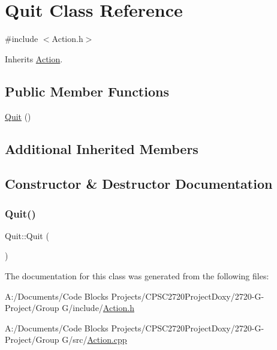 \hypertarget{class_quit}{}\section{Quit Class Reference}
\label{class_quit}


{\ttfamily \#include $<$Action.\+h$>$}



Inherits \mbox{\hyperlink{class_action}{Action}}.

\subsection*{Public Member Functions}
\begin{DoxyCompactItemize}
\item 
\mbox{\hyperlink{class_quit_a645048717f155302b8fd1fe1785516d4}{Quit}} ()
\end{DoxyCompactItemize}
\subsection*{Additional Inherited Members}


\subsection{Constructor \& Destructor Documentation}
\mbox{\label{class_quit_a645048717f155302b8fd1fe1785516d4}} 
\subsubsection{\texorpdfstring{Quit()}{Quit()}}
{\footnotesize\ttfamily Quit\+::\+Quit (\begin{DoxyParamCaption}{ }\end{DoxyParamCaption})}



The documentation for this class was generated from the following files\+:\begin{DoxyCompactItemize}
\item 
A\+:/\+Documents/\+Code Blocks Projects/\+C\+P\+S\+C2720\+Project\+Doxy/2720-\/\+G-\/\+Project/\+Group G/include/\mbox{\hyperlink{_action_8h}{Action.\+h}}\item 
A\+:/\+Documents/\+Code Blocks Projects/\+C\+P\+S\+C2720\+Project\+Doxy/2720-\/\+G-\/\+Project/\+Group G/src/\mbox{\hyperlink{_action_8cpp}{Action.\+cpp}}\end{DoxyCompactItemize}
